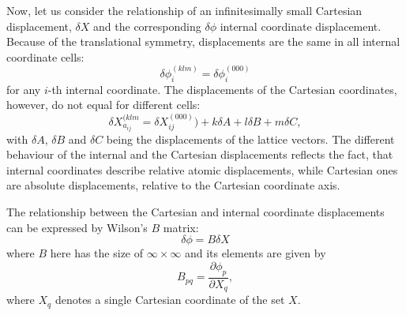 \documentclass[prl,aps,preprint,superbib,12pt]{revtex4}
\begin{document}
Now, let us consider the relationship of an infinitesimally small
Cartesian displacement, $\delta X$ and the corresponding $\delta \phi$
internal coordinate displacement.
Because of the translational symmetry, displacements are the same
in all internal coordinate cells:
\begin{equation}
\delta \phi^{(klm)}_{i} = \delta \phi^{(000)}_{i} 
\end{equation}
for any $i$-th internal coordinate.
The displacements of the Cartesian coordinates, however, do not equal
for different cells: 
\begin{equation} \label{cartdispl}
\delta X^{(klm}_{a_{ij}} = \delta X^{(000)}_{ij}) + k \delta A 
+ l \delta B + m \delta C ,
\end{equation}
with $\delta A$, $\delta B$ and $\delta C$
being the displacements of the lattice vectors. 
The different behaviour of the internal and the Cartesian displacements
reflects the fact, that internal coordinates describe relative
atomic displacements, while Cartesian ones are absolute displacements, 
relative to the Cartesian coordinate axis.

The relationship between the Cartesian and internal coordinate 
displacements can be expressed by Wilson's $B$ matrix:
\begin{equation}
\delta \phi = B \delta X
\end{equation}
where $B$ here has the size of $\infty \times \infty$ and its
elements are given by
\begin{equation}
B_{pq}= \frac{\partial \phi_{p}}{\partial X_{q}} , 
\end{equation}
where $X_{q}$ denotes a single Cartesian coordinate of the set $X$.
\end{document}
